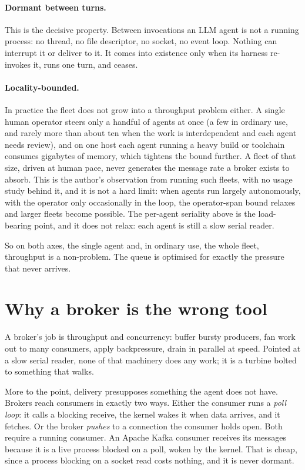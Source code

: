 \documentclass[11pt]{article}
\begin{document}
\paragraph{Dormant between turns.} This is the decisive property. Between invocations an LLM agent is not a running process: no thread, no file descriptor, no socket, no event loop. Nothing can interrupt it or deliver to it. It comes into existence only when its harness re-invokes it, runs one turn, and ceases.

\paragraph{Locality-bounded.} In practice the fleet does not grow into a throughput problem either. A single human operator steers only a handful of agents at once (a few in ordinary use, and rarely more than about ten when the work is interdependent and each agent needs review), and on one host each agent running a heavy build or toolchain consumes gigabytes of memory, which tightens the bound further. A fleet of that size, driven at human pace, never generates the message rate a broker exists to absorb. This is the author's observation from running such fleets, with no usage study behind it, and it is not a hard limit: when agents run largely autonomously, with the operator only occasionally in the loop, the operator-span bound relaxes and larger fleets become possible. The per-agent seriality above is the load-bearing point, and it does not relax: each agent is still a slow serial reader.

So on both axes, the single agent and, in ordinary use, the whole fleet, throughput is a non-problem. The queue is optimised for exactly the pressure that never arrives.

\section{Why a broker is the wrong tool}

A broker's job is throughput and concurrency: buffer bursty producers, fan work out to many consumers, apply backpressure, drain in parallel at speed. Pointed at a slow serial reader, none of that machinery does any work; it is a turbine bolted to something that walks.

More to the point, delivery presupposes something the agent does not have. Brokers reach consumers in exactly two ways. Either the consumer runs a \emph{poll loop}: it calls a blocking receive, the kernel wakes it when data arrives, and it fetches. Or the broker \emph{pushes} to a connection the consumer holds open. Both require a running consumer. An Apache Kafka consumer receives its messages because it is a live process blocked on a poll, woken by the kernel. That is cheap, since a process blocking on a socket read costs nothing, and it is never dormant.
\end{document}
